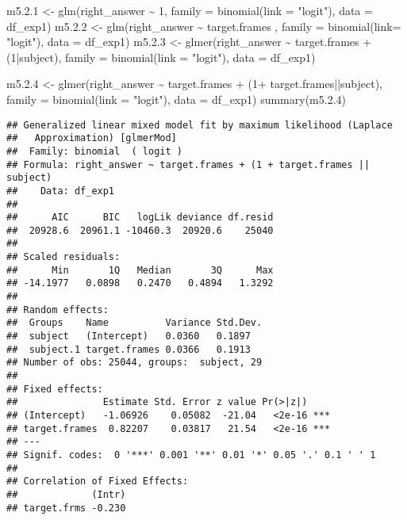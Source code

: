 \documentclass[
]{article}
\newenvironment{Shaded}{\begin{snugshade}}{\end{snugshade}}
\newcommand{\AttributeTok}[1]{\textcolor[rgb]{0.77,0.63,0.00}{#1}}
\newcommand{\DecValTok}[1]{\textcolor[rgb]{0.00,0.00,0.81}{#1}}
\newcommand{\FloatTok}[1]{\textcolor[rgb]{0.00,0.00,0.81}{#1}}
\newcommand{\FunctionTok}[1]{\textcolor[rgb]{0.00,0.00,0.00}{#1}}
\newcommand{\NormalTok}[1]{#1}
\newcommand{\OtherTok}[1]{\textcolor[rgb]{0.56,0.35,0.01}{#1}}
\newcommand{\SpecialCharTok}[1]{\textcolor[rgb]{0.00,0.00,0.00}{#1}}
\newcommand{\StringTok}[1]{\textcolor[rgb]{0.31,0.60,0.02}{#1}}
\begin{document}
\begin{Shaded}
\begin{Highlighting}[]
\NormalTok{m5.}\FloatTok{2.1} \OtherTok{\textless{}{-}} \FunctionTok{glm}\NormalTok{(right\_answer }\SpecialCharTok{\textasciitilde{}} \DecValTok{1}\NormalTok{, }\AttributeTok{family =} \FunctionTok{binomial}\NormalTok{(}\AttributeTok{link =} \StringTok{"logit"}\NormalTok{), }\AttributeTok{data =}\NormalTok{ df\_exp1)}
\NormalTok{m5.}\FloatTok{2.2} \OtherTok{\textless{}{-}} \FunctionTok{glm}\NormalTok{(right\_answer }\SpecialCharTok{\textasciitilde{}}\NormalTok{ target.frames , }\AttributeTok{family =} \FunctionTok{binomial}\NormalTok{(}\AttributeTok{link=} \StringTok{"logit"}\NormalTok{), }\AttributeTok{data =}\NormalTok{ df\_exp1)}
\NormalTok{m5.}\FloatTok{2.3} \OtherTok{\textless{}{-}} \FunctionTok{glmer}\NormalTok{(right\_answer }\SpecialCharTok{\textasciitilde{}}\NormalTok{ target.frames }\SpecialCharTok{+}\NormalTok{ (}\DecValTok{1}\SpecialCharTok{|}\NormalTok{subject), }\AttributeTok{family =} \FunctionTok{binomial}\NormalTok{(}\AttributeTok{link =} \StringTok{"logit"}\NormalTok{), }\AttributeTok{data =}\NormalTok{ df\_exp1)}

\NormalTok{m5.}\FloatTok{2.4} \OtherTok{\textless{}{-}} \FunctionTok{glmer}\NormalTok{(right\_answer }\SpecialCharTok{\textasciitilde{}}\NormalTok{ target.frames  }\SpecialCharTok{+}\NormalTok{ (}\DecValTok{1}\SpecialCharTok{+}\NormalTok{ target.frames}\SpecialCharTok{||}\NormalTok{subject), }\AttributeTok{family =} \FunctionTok{binomial}\NormalTok{(}\AttributeTok{link =} \StringTok{"logit"}\NormalTok{), }\AttributeTok{data =}\NormalTok{ df\_exp1)}
\FunctionTok{summary}\NormalTok{(m5.}\FloatTok{2.4}\NormalTok{)}
\end{Highlighting}
\end{Shaded}

\begin{verbatim}
## Generalized linear mixed model fit by maximum likelihood (Laplace
##   Approximation) [glmerMod]
##  Family: binomial  ( logit )
## Formula: right_answer ~ target.frames + (1 + target.frames || subject)
##    Data: df_exp1
## 
##      AIC      BIC   logLik deviance df.resid 
##  20928.6  20961.1 -10460.3  20920.6    25040 
## 
## Scaled residuals: 
##      Min       1Q   Median       3Q      Max 
## -14.1977   0.0898   0.2470   0.4894   1.3292 
## 
## Random effects:
##  Groups    Name          Variance Std.Dev.
##  subject   (Intercept)   0.0360   0.1897  
##  subject.1 target.frames 0.0366   0.1913  
## Number of obs: 25044, groups:  subject, 29
## 
## Fixed effects:
##               Estimate Std. Error z value Pr(>|z|)    
## (Intercept)   -1.06926    0.05082  -21.04   <2e-16 ***
## target.frames  0.82207    0.03817   21.54   <2e-16 ***
## ---
## Signif. codes:  0 '***' 0.001 '**' 0.01 '*' 0.05 '.' 0.1 ' ' 1
## 
## Correlation of Fixed Effects:
##             (Intr)
## target.frms -0.230
\end{verbatim}
\end{document}

